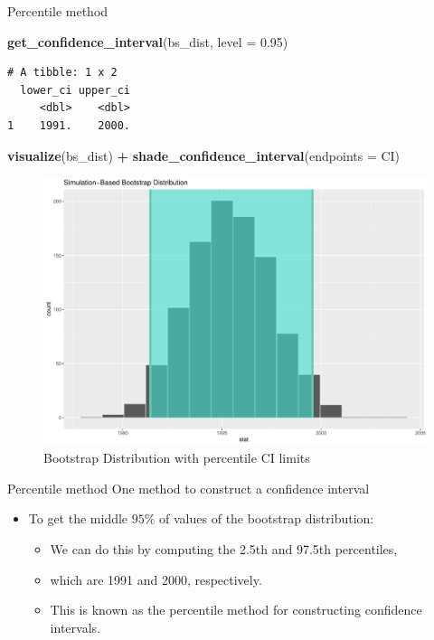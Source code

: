 \documentclass[
  ignorenonframetext,
]{beamer}
\newenvironment{Shaded}{\begin{snugshade}}{\end{snugshade}}
\newcommand{\AttributeTok}[1]{\textcolor[rgb]{0.13,0.29,0.53}{#1}}
\newcommand{\FloatTok}[1]{\textcolor[rgb]{0.00,0.00,0.81}{#1}}
\newcommand{\FunctionTok}[1]{\textcolor[rgb]{0.13,0.29,0.53}{\textbf{#1}}}
\newcommand{\NormalTok}[1]{#1}
\newcommand{\SpecialCharTok}[1]{\textcolor[rgb]{0.81,0.36,0.00}{\textbf{#1}}}
\providecommand{\tightlist}{%
  \setlength{\itemsep}{0pt}\setlength{\parskip}{0pt}}
\begin{document}
\begin{frame}[fragile]{Percentile method}
\protect\hypertarget{percentile-method-1}{}
\small

\begin{Shaded}
\begin{Highlighting}[]
\FunctionTok{get\_confidence\_interval}\NormalTok{(bs\_dist, }\AttributeTok{level =} \FloatTok{0.95}\NormalTok{)}
\end{Highlighting}
\end{Shaded}

\begin{verbatim}
# A tibble: 1 x 2
  lower_ci upper_ci
     <dbl>    <dbl>
1    1991.    2000.
\end{verbatim}

\begin{Shaded}
\begin{Highlighting}[]
\FunctionTok{visualize}\NormalTok{(bs\_dist) }\SpecialCharTok{+} 
  \FunctionTok{shade\_confidence\_interval}\NormalTok{(}\AttributeTok{endpoints =}\NormalTok{ CI)}
\end{Highlighting}
\end{Shaded}

\begin{figure}

{\centering \includegraphics[width=0.5\linewidth,height=0.4\textheight]{Week10_Lect_files/figure-beamer/bsci-1} 

}

\caption{Bootstrap Distribution with percentile CI limits}\label{fig:bsci}
\end{figure}
\normalsize
\end{frame}

\begin{frame}{Percentile method}
\protect\hypertarget{percentile-method-2}{}
One method to construct a confidence interval

\begin{itemize}
\item
  To get the middle \(95\%\) of values of the bootstrap distribution:

  \begin{itemize}
  \tightlist
  \item
    We can do this by computing the 2.5th and 97.5th percentiles,
  \item
    which are 1991 and 2000, respectively.
  \item
    This is known as the percentile method for constructing confidence
    intervals.
  \end{itemize}
\end{itemize}
\end{frame}
\end{document}
